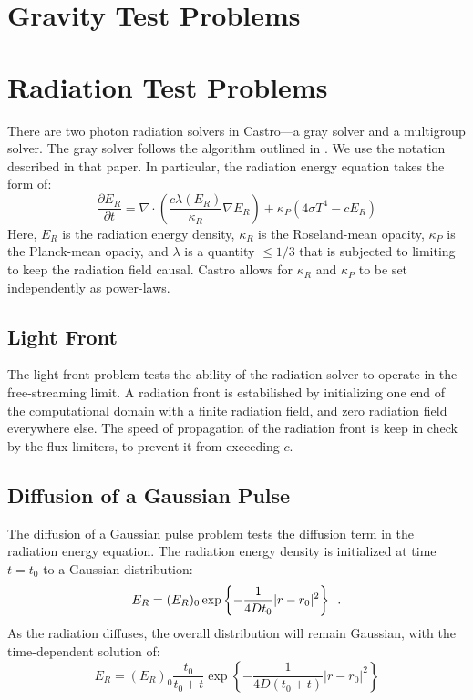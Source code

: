 \section{Gravity Test Problems}



\section{Radiation Test Problems}

There are two photon radiation solvers in Castro---a gray solver and a
multigroup solver.  The gray solver follows the algorithm outlined
in \cite{howellgreenough:2003}.  We use the notation described in that
paper.  In particular, the radiation energy equation takes the form
of:
\begin{equation}
\frac{\partial E_R}{\partial t} = 
 \nabla \cdot \left ( \frac{c \lambda(E_R)}{\kappa_R} \nabla E_R \right ) +
 \kappa_P (4 \sigma T^4 - c E_R )
\end{equation}
Here, $E_R$ is the radiation energy density, $\kappa_R$ is the
Roseland-mean opacity, $\kappa_P$ is the Planck-mean opaciy, and
$\lambda$ is a quantity $\le 1/3$ that is subjected to limiting to
keep the radiation field causal.  Castro allows for $\kappa_R$
and $\kappa_P$ to be set independently as power-laws.

\subsection{Light Front}

The light front problem tests the ability of the radiation solver to
operate in the free-streaming limit.  A radiation front is
estabilished by initializing one end of the computational domain with
a finite radiation field, and zero radiation field everywhere else.
The speed of propagation of the radiation front is keep in check by
the flux-limiters, to prevent it from exceeding $c$.


\subsection{Diffusion of a Gaussian Pulse}

The diffusion of a Gaussian pulse problem tests the diffusion term in
the radiation energy equation.  The radiation energy density is 
initialized at time $t = t_0$ to a Gaussian distribution:
\begin{equation}
E_R = (E_R)_0 \exp \left \{ - \frac{1}{4 D t_0} |r - r_0|^2 \right \} \enskip .
\end{equation}
As the radiation diffuses, the overall distribution will remain 
Gaussian, with the time-dependent solution of:
\begin{equation}
E_R = (E_R)_0 \frac{t_0}{t_0 + t} \exp \left \{ -\frac{1}{4 D (t_0 + t)} |r - r_0|^2 \right \}
\end{equation}


